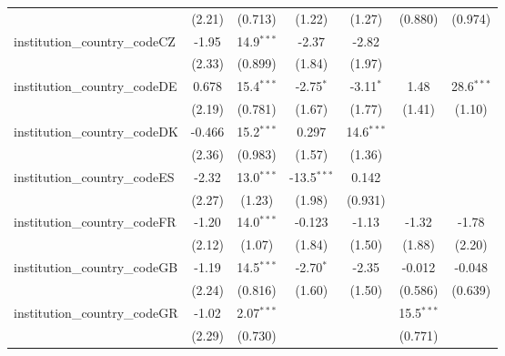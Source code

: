 \begin{tabular}{lcccccc}
                                         & (2.21)        & (0.713)       & (1.22)        & (1.27)        & (0.880)       & (0.974)\\   
   institution\_country\_codeCZ          & -1.95         & 14.9$^{***}$  & -2.37         & -2.82         &               &   \\   
                                         & (2.33)        & (0.899)       & (1.84)        & (1.97)        &               &   \\   
   institution\_country\_codeDE          & 0.678         & 15.4$^{***}$  & -2.75$^{*}$   & -3.11$^{*}$   & 1.48          & 28.6$^{***}$\\   
                                         & (2.19)        & (0.781)       & (1.67)        & (1.77)        & (1.41)        & (1.10)\\   
   institution\_country\_codeDK          & -0.466        & 15.2$^{***}$  & 0.297         & 14.6$^{***}$  &               &   \\   
                                         & (2.36)        & (0.983)       & (1.57)        & (1.36)        &               &   \\   
   institution\_country\_codeES          & -2.32         & 13.0$^{***}$  & -13.5$^{***}$ & 0.142         &               &   \\   
                                         & (2.27)        & (1.23)        & (1.98)        & (0.931)       &               &   \\   
   institution\_country\_codeFR          & -1.20         & 14.0$^{***}$  & -0.123        & -1.13         & -1.32         & -1.78\\   
                                         & (2.12)        & (1.07)        & (1.84)        & (1.50)        & (1.88)        & (2.20)\\   
   institution\_country\_codeGB          & -1.19         & 14.5$^{***}$  & -2.70$^{*}$   & -2.35         & -0.012        & -0.048\\   
                                         & (2.24)        & (0.816)       & (1.60)        & (1.50)        & (0.586)       & (0.639)\\   
   institution\_country\_codeGR          & -1.02         & 2.07$^{***}$  &               &               & 15.5$^{***}$  &   \\   
                                         & (2.29)        & (0.730)       &               &               & (0.771)       &   \\   

\end{tabular}
